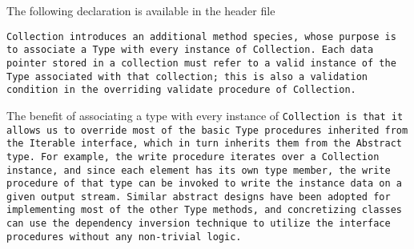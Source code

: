 The following declaration is available in the header file

\tt{Collection} introduces an additional method \tt{species},
whose purpose is to associate a \tt{Type} with every instance of \tt{Collection}.
Each data pointer stored in a collection must refer to a valid instance of
the \tt{Type} associated with that collection; this is also a validation
condition in the overriding \tt{validate} procedure of \tt{Collection}.

The benefit of associating a type with every instance of \tt{Collection} is that
it allows us to override most of the basic \tt{Type} procedures inherited from the
\tt{Iterable} interface, which in turn inherits them from the \tt{Abstract} type.
For example, the \tt{write} procedure iterates over a \tt{Collection} instance,
and since each element has its own \tt{type} member, the \tt{write} procedure of
that \tt{type} can be invoked to write the instance data on a given output stream.
Similar abstract designs have been adopted for implementing most of the other
\tt{Type} methods, and concretizing classes can use the dependency inversion
technique to utilize the interface procedures without any non-trivial logic.
